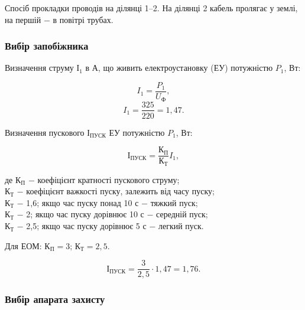 Спосіб прокладки проводів на ділянці 1–2. На ділянці 2 кабель пролягає у землі, на першій $-$ в повітрі трубах.

\subsubsection{Вибір запобіжника}

Визначення струму $І_{1}$ в А, що живить електроустановку (ЕУ) потужністю $P_{1}$, Вт:

\begin{equation}
	I_{1} = \frac{P_{1}}{U_{\text{Ф}}},
\end{equation}
\[
	I_{1} = \frac{325}{220} = 1,47.
\]

\vspace{1.5em}

Визначення пускового $І_{\text{ПУСК}}$ ЕУ потужністю $P_{\text{1}}$, Вт:

\begin{equation}\label{eq:work3}
	І_{\text{ПУСК}} = \frac{\text{К}_{\text{П}}}{\text{К}_{\text{Т}}} I_{1},
\end{equation}

\noindent де $\text{К}_{\text{П}}$ $-$ коефіцієнт кратності пускового струму; \\
\hspace*{15pt} $\text{К}_{\text{Т}}$ $-$ коефіцієнт важкості пуску, залежить від часу пуску; \\
\hspace*{15pt} $\text{К}_{\text{Т}}$ $-$ 1,6; якщо час пуску понад 10 с $-$ тяжкий пуск; \\
\hspace*{15pt} $\text{К}_{\text{Т}}$ $-$ 2; якщо час пуску дорівнює 10 с $-$ середній пуск; \\
\hspace*{15pt} $\text{К}_{\text{Т}}$ $-$ 2,5; якщо час пуску дорівнює 5 с $-$ легкий пуск. \\

\vspace{1.5em}

Для ЕОМ: $\text{К}_{\text{П}} = 3; \, \text{К}_{\text{Т}} = 2,5$.

\[
	І_{\text{ПУСК}} = \frac{3}{2,5} \cdot 1,47 = 1,76.
\]

\vspace{1.5em}

\subsubsection{Вибір апарата захисту}

